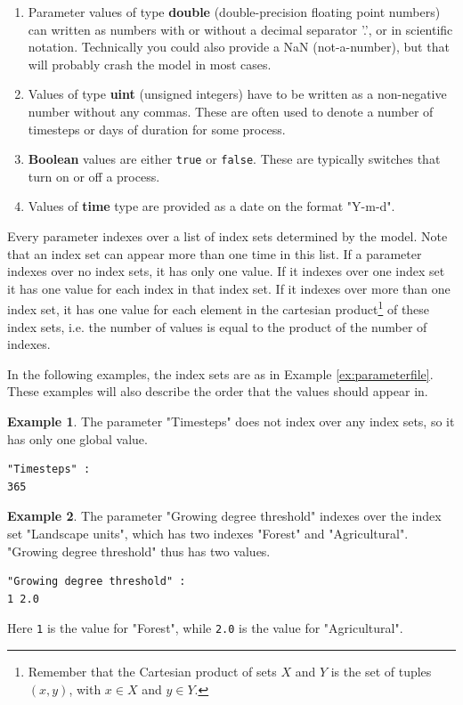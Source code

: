\documentclass[11pt]{article}
\theoremstyle{definition}
\newtheorem{myexample}{Example}
\newenvironment{example}%
  {\begin{lrbox}{\examplebox}%
   \begin{minipage}{\dimexpr\linewidth-2\fboxsep}
   \begin{myexample}}%
  {\end{myexample}%
   \end{minipage}%
   \end{lrbox}%
   \begin{trivlist}
     \item[]\colorbox{silver}{\usebox\examplebox}
   \end{trivlist}}
\begin{document}
\begin{enumerate}[i]
\item Parameter values of type {\bf double} (double-precision floating point numbers) can written as numbers with or without a decimal separator '.', or in scientific notation. Technically you could also provide a NaN (not-a-number), but that will probably crash the model in most cases.
\item Values of type {\bf uint} (unsigned integers) have to be written as a non-negative number without any commas. These are often used to denote a number of timesteps or days of duration for some process.
\item {\bf Boolean} values are either {\tt true} or {\tt false}. These are typically switches that turn on or off a process.
\item Values of {\bf time} type are provided as a date on the format "Y-m-d".
\end{enumerate}

Every parameter indexes over a list of index sets determined by the model. Note that an index set can appear more than one time in this list. If a parameter indexes over no index sets, it has only one value. If it indexes over one index set it has one value for each index in that index set. If it indexes over more than one index set, it has one value for each element in the cartesian product\footnote{Remember that the Cartesian product of sets $X$ and $Y$ is the set of tuples $(x, y)$, with $x\in X$ and $y\in Y$.} of these index sets, i.e. the number of values is equal to the product of the number of indexes.

In the following examples, the index sets are as in Example \ref{ex:parameterfile}. These examples will also describe the order that the values should appear in.

\begin{example}
The parameter "Timesteps" does not index over any index sets, so it has only one global value.
\begin{lstlisting}
"Timesteps" :
365
\end{lstlisting}
\end{example}

\begin{example}
The parameter "Growing degree threshold" indexes over the index set "Landscape units", which has two indexes "Forest" and "Agricultural". "Growing degree threshold" thus has two values.
\begin{lstlisting}
"Growing degree threshold" :
1 2.0
\end{lstlisting}
Here {\tt 1} is the value for "Forest", while {\tt 2.0} is the value for "Agricultural".
\end{example}
\end{document}
